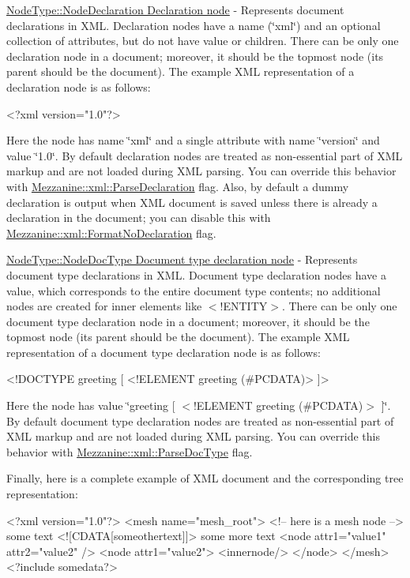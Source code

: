 \begin{DoxyItemize}
\item \hyperlink{namespaceMezzanine_1_1xml_a524d867e34ff408b8f45a51b7924cb80}{NodeType::NodeDeclaration Declaration node} -\/ Represents document declarations in XML. Declaration nodes have a name (\char`\"{}xml\char`\"{}) and an optional collection of attributes, but do not have value or children. There can be only one declaration node in a document; moreover, it should be the topmost node (its parent should be the document). The example XML representation of a declaration node is as follows: 
\begin{DoxyCode}
 <?xml version="1.0"?> 
\end{DoxyCode}
 Here the node has name \char`\"{}xml\char`\"{} and a single attribute with name \char`\"{}version\char`\"{} and value \char`\"{}1.0\char`\"{}. By default declaration nodes are treated as non-\/essential part of XML markup and are not loaded during XML parsing. You can override this behavior with \hyperlink{namespaceMezzanine_1_1xml_a642e0534edcb90c314a3767941077cd0}{Mezzanine::xml::ParseDeclaration} flag. Also, by default a dummy declaration is output when XML document is saved unless there is already a declaration in the document; you can disable this with \hyperlink{namespaceMezzanine_1_1xml_a24412cfad59b402e85cbe6ad5093917a}{Mezzanine::xml::FormatNoDeclaration} flag. \par

\item \hyperlink{namespaceMezzanine_1_1xml_a524d867e34ff408b8f45a51b7924cb80}{NodeType::NodeDocType Document type declaration node} -\/ Represents document type declarations in XML. Document type declaration nodes have a value, which corresponds to the entire document type contents; no additional nodes are created for inner elements like $<$!ENTITY$>$. There can be only one document type declaration node in a document; moreover, it should be the topmost node (its parent should be the document). The example XML representation of a document type declaration node is as follows: 
\begin{DoxyCode}
 <!DOCTYPE greeting [ <!ELEMENT greeting (#PCDATA)> ]> 
\end{DoxyCode}
 Here the node has value \char`\"{}greeting \mbox{[} $<$!ELEMENT greeting (\#PCDATA)$>$ \mbox{]}\char`\"{}. By default document type declaration nodes are treated as non-\/essential part of XML markup and are not loaded during XML parsing. You can override this behavior with \hyperlink{namespaceMezzanine_1_1xml_aea8775764346a3988ca2aef15beecd5e}{Mezzanine::xml::ParseDocType} flag. \par
 \par
 \par
 Finally, here is a complete example of XML document and the corresponding tree representation: 
\begin{DoxyCode}
 <?xml version="1.0"?>
 <mesh name="mesh_root">
     <!-- here is a mesh node -->
     some text
     <![CDATA[someothertext]]>
     some more text
     <node attr1="value1" attr2="value2" />
     <node attr1="value2">
         <innernode/>
     </node>
 </mesh>
 <?include somedata?>
\end{DoxyCode}
  

\end{DoxyItemize}
